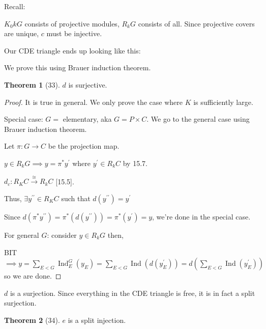 \documentclass{article}
\theoremstyle{definition}
\newtheorem{theorem}{Theorem}
\begin{document}
Recall:

\(K_0 kG\) consists of projective modules, \(R_k G\) consists of all. Since projective covers are unique, \(c\) must be injective.

Our CDE triangle ends up looking like this:

\begin{center}
\end{center}

We prove this using Brauer induction theorem.

\begin{theorem}
    [33] \(d\) is surjective.
\end{theorem}

\begin{proof}
    It is true in general. We only prove the case where \(K\) is sufficiently large.

    Special case: \(G =\) elementary, aka \(G = P \times C\). We go to the general case using Brauer induction theorem.

    Let \(\pi: G \to C\) be the projection map.

    \(y\in R_k G \implies y = \pi^{\ast} y^{\prime}\) where \(y^{\prime} \in R_k C\) by 15.7.
    
    \(d_c: R_K C \overset{\cong}{\to} R_k C\) [15.5].
    
    Thus, \(\exists y^{\prime\prime} \in R_K C\) such that \(d(y^{\prime\prime}) = y^{\prime}\) 
    
    Since \(d(\pi^{\ast} y^{\prime\prime}) =  \pi^{\ast} (d(y^{\prime\prime})) = \pi^{\ast} (y^{\prime}) = y\), we're done in the special case.

    For general \(G\): consider \(y\in R_k G\) then,
    
    BIT \(\implies y = \sum_{E < G} \operatorname{Ind}_E^G (y_E) = \sum_{E < G} \operatorname{Ind}(d(y_E^{\prime})) = d \left( \sum_{E < G} \operatorname{Ind} (y_E^{\prime}) \right)\) so we are done. 

\end{proof}

\(d\) is a surjection. Since everything in the CDE triangle is free, it is in fact a split surjection.

\begin{theorem}
    [34] \(e\) is a split injection.
\end{theorem}
\end{document}
